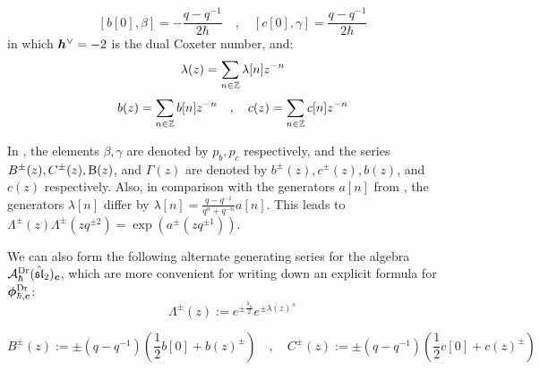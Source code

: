                 \begin{equation} \label{equation: q_deformed_affine_sl_2_oscillator_beta_gamma_commutators}
                    [ b[0], \beta ] = -\frac{q - q^{-1}}{2\hbar} \quad, \quad [ c[0], \gamma ] = \frac{q - q^{-1}}{2\hbar}
                \end{equation}
            in which $\boldsymbol{h}^{\vee} = -2$ is the dual Coxeter number, and:
                $$\lambda(z) = \sum_{n \in \mathbb{Z}} \lambda[n] z^{-n}$$
                $$
                    b(z) = \sum_{n \in \mathbb{Z}} b[n] z^{-n} \quad, \quad c(z) = \sum_{n \in \mathbb{Z}} c[n] z^{-n}
                $$
            \begin{remark}
                In \cite{frenkel_reshetikhin_affine_QUEs_and_deformed_virasoro_and_finite_W_algebras}, the elements $\beta, \gamma$ are denoted by $p_b, p_c$ respectively, and the series $B^{\pm}(z), C^{\pm}(z), \mathrm{B}(z)$, and $\Gamma(z)$ are denoted by $b^{\pm}(z), c^{\pm}(z), b(z)$, and $c(z)$ respectively. Also, in comparison with the generators $a[n]$ from \cite{awata_odake_shiraishi_free_boson_realisation_of_quantum_affine_sl_N}, the generators $\lambda[n]$ differ by $\lambda[n] = \frac{q - q^{-1}}{q^n + q^{-n}} a[n]$. This leads to $\Lambda^{\pm}(z) \Lambda^{\pm}(z q^{\pm 2}) = \exp\left( a^{\pm}( z q^{\pm 1} ) \right)$. 
            \end{remark}
                
            We can also form the following alternate generating series for the algebra $\mathcal{A}_{\hbar}^{\mathrm{Dr}}(\hat{\mathfrak{sl}}_2)_{\boldsymbol{c}}$, which are more convenient for writing down an explicit formula for $\boldsymbol{\phi}^{\mathrm{Dr}}_{\hbar, \boldsymbol{c}}$:
                \begin{equation} \label{equation: q_deformed_affine_sl_2_oscillator_Lambda_generating_series}
                    \Lambda^{\pm}(z) := e^{ \pm \frac{\lambda_0}{2} } e^{ \pm \lambda(z)^{\pm} }
                \end{equation}
                
                \begin{equation} \label{equation: q_deformed_affine_sl_2_oscillator_BC_generating_series}
                    B^{\pm}(z) := \pm (q - q^{-1}) \left( \frac12 b[0] + b(z)^{\pm} \right)
                    \quad, \quad
                    C^{\pm}(z) := \pm (q - q^{-1}) \left( \frac12 c[0] + c(z)^{\pm} \right)
                \end{equation}
                
